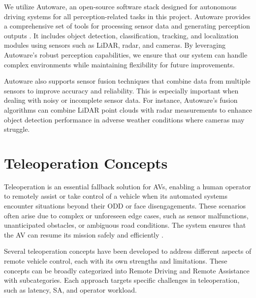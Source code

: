 We utilize Autoware, an open-source software stack designed for autonomous driving systems for all perception-related tasks in this project. Autoware provides a comprehensive set of tools for processing sensor data and generating perception outputs \cite{kato2018autoware}. It includes object detection, classification, tracking, and localization modules using sensors such as \ac{LiDAR}, radar, and cameras. By leveraging Autoware's robust perception capabilities, we ensure that our system can handle complex environments while maintaining flexibility for future improvements.

Autoware also supports sensor fusion techniques that combine data from multiple sensors to improve accuracy and reliability. This is especially important when dealing with noisy or incomplete sensor data. For instance, Autoware's fusion algorithms can combine \ac{LiDAR} point clouds with radar measurements to enhance object detection
performance in adverse weather conditions where cameras may struggle.
\section{Teleoperation Concepts} \label{section:teleoperation}

Teleoperation is an essential fallback solution for \acp{AV},
enabling a human operator to remotely assist or take control of a vehicle when
its automated systems encounter situations beyond their \ac{ODD}
or face disengagements. These scenarios often arise due to complex or unforeseen edge cases,
such as sensor malfunctions, unanticipated obstacles, or ambiguous road conditions.
The system ensures that the \ac{AV} can resume its mission safely and efficiently \cite{Brecht}.

Several teleoperation concepts have been developed to address different aspects of remote vehicle control, each with its own strengths and limitations. These concepts can be broadly categorized into Remote Driving and Remote Assistance with subcategories. Each approach targets specific challenges in teleoperation, such as latency, \ac{SA}, and operator workload.

